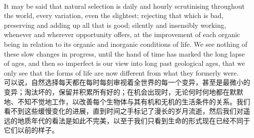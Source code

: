 \documentclass{article}
\begin{document}
\\
It may be said that natural selection is daily and hourly scrutinising throughout the world, every variation, even the slightest; rejecting that which is bad, preserving and adding up all that is good; silently and insensibly working, whenever and wherever opportunity offers, at the improvement of each organic being in relation to its organic and inorganic conditions of life. We see nothing of these slow changes in progress, until the hand of time has marked the long lapse of ages, and then so imperfect is our view into long past geological ages, that we only see that the forms of life are now different from what they formerly were.\\
可以说，自然选择每天都在每时每刻审视着全世界的每一个变异，甚至是最微小的变异；淘汰坏的，保留并积累所有好的；在机会出现时，无论何时何地都在默默地、不知不觉地工作，以改善每个生物体与其有机和无机的生活条件的关系。我们看不到这些缓慢变化的进展，直到时间之手标记了漫长的岁月流逝，然后我们对遥远的地质年代的看法是如此不完美，以至于我们只看到生命的形式现在已经不同于它们以前的样子。\\
\end{document}
